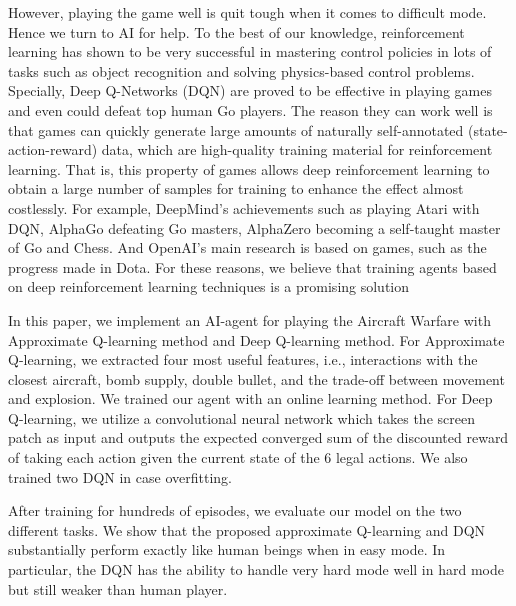 \documentclass{article}
\begin{document}
\par However, playing the game well is quit tough when it comes to difficult mode. Hence we turn to AI for help. To the best of our knowledge, reinforcement learning has shown to be very successful in mastering control policies in lots of tasks such as object recognition and solving physics-based control problems\cite{kempka2016vizdoom}. Specially, Deep Q-Networks (DQN) are proved to be effective in playing games and even could defeat top human Go players\cite{heess2015learning, mnih2013playing}. The reason they can work well is that games can quickly generate large amounts of naturally self-annotated (state-action-reward) data, which are high-quality training material for reinforcement learning. That is, this property of games allows deep reinforcement learning to obtain a large number of samples for training to enhance the effect almost costlessly. For example, DeepMind's achievements such as playing Atari with DQN, AlphaGo defeating Go masters, AlphaZero becoming a self-taught master of Go and Chess. And OpenAI's main research is based on games, such as the progress made in Dota. For these reasons, we believe that training agents based on deep reinforcement learning techniques is a promising solution

\par In this paper, we implement an AI-agent for playing the Aircraft Warfare with Approximate Q-learning method and Deep Q-learning method. For Approximate Q-learning, we extracted four most useful features, i.e., interactions with the closest aircraft, bomb supply, double bullet, and the trade-off between movement and explosion. We trained our agent with an online learning method. For Deep Q-learning, we utilize a convolutional neural network which takes the screen patch as input and outputs the expected converged sum of the discounted reward of taking each action given the current state of the 6 legal actions. We also trained two DQN in case overfitting. 

\par After training for hundreds of episodes, we evaluate our model on the two different tasks. We show that the proposed approximate Q-learning and DQN substantially perform exactly like human beings when in easy mode. In particular, the DQN has the ability to handle very hard mode well in hard mode but still weaker than human player.

\end{document}
